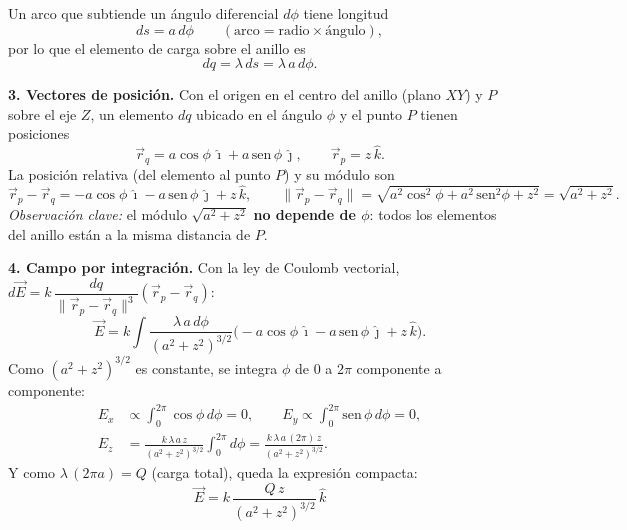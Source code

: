 \documentclass[12pt,letterpaper]{article}
\newcommand{\secgap}{\vspace{0.6cm}}
\begin{document}
\noindent
\begin{minipage}[c]{0.31\textwidth}
\centering
{}
\end{minipage}%
\hfill
\begin{minipage}[c]{0.65\textwidth}
Un arco que subtiende un \'angulo diferencial $d\phi$ tiene longitud
\[
    ds = a\,d\phi \qquad(\text{arco}=\text{radio}\times\text{\'angulo}),
\]
por lo que el elemento de carga sobre el anillo es
\[
    dq = \lambda\,ds = \lambda\,a\,d\phi.
\]
\end{minipage}

\secgap

\noindent\textbf{3. Vectores de posici\'on.} Con el origen en el centro del anillo (plano $XY$) y $P$ sobre
el eje $Z$, un elemento $dq$ ubicado en el \'angulo $\phi$ y el punto $P$ tienen posiciones
\[
    \vec r_q = a\cos\phi\,\hat\imath + a\,\mathrm{sen}\,\phi\,\hat\jmath,
    \qquad
    \vec r_p = z\,\hat k.
\]
La posici\'on relativa (del elemento al punto $P$) y su m\'odulo son
\[
    \vec r_p-\vec r_q = -a\cos\phi\,\hat\imath - a\,\mathrm{sen}\,\phi\,\hat\jmath + z\,\hat k,
    \qquad
    \lVert\vec r_p-\vec r_q\rVert = \sqrt{a^2\cos^2\phi + a^2\,\mathrm{sen}^2\phi + z^2}
    = \sqrt{a^2+z^2}.
\]
\noindent\textit{Observaci\'on clave:} el m\'odulo $\sqrt{a^2+z^2}$ \textbf{no depende de $\phi$}: todos los
elementos del anillo est\'an a la misma distancia de $P$.

\secgap

\noindent\textbf{4. Campo por integraci\'on.} Con la ley de Coulomb vectorial,
$d\vec E = k\,\dfrac{dq}{\lVert\vec r_p-\vec r_q\rVert^{3}}(\vec r_p-\vec r_q)$:
\[
    \vec E = k\int \frac{\lambda\,a\,d\phi}{(a^2+z^2)^{3/2}}
             \big(-a\cos\phi\,\hat\imath - a\,\mathrm{sen}\,\phi\,\hat\jmath + z\,\hat k\big).
\]
Como $(a^2+z^2)^{3/2}$ es constante, se integra $\phi$ de $0$ a $2\pi$ componente a componente:
\begin{align*}
    E_x &\propto \int_0^{2\pi}\!\cos\phi\,d\phi = 0, \qquad
    E_y \propto \int_0^{2\pi}\!\mathrm{sen}\,\phi\,d\phi = 0,\\[2pt]
    E_z &= \frac{k\,\lambda\,a\,z}{(a^2+z^2)^{3/2}}\int_0^{2\pi}\!d\phi
         = \frac{k\,\lambda\,a\,(2\pi)\,z}{(a^2+z^2)^{3/2}}.
\end{align*}
Y como $\lambda\,(2\pi a)=Q$ (carga total), queda la expresi\'on compacta:
\[
    \boxed{\ \vec E = k\,\frac{Q\,z}{(a^2+z^2)^{3/2}}\,\hat k\ }
\]
\end{document}
